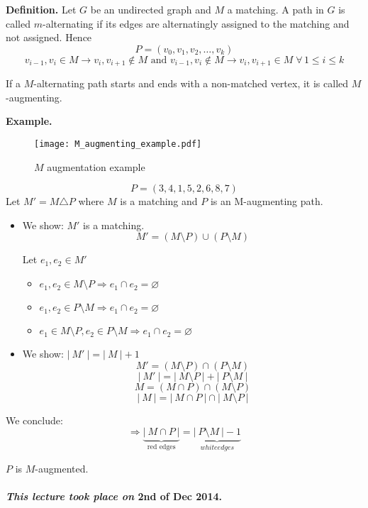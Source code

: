 \documentclass{article}
\newcommand{\card}[1]{\left|\:\!#1\:\!\right|}
\newcommand{\dateref}[1]{\paragraph{\textit{This lecture took place on} #1.}}
\newcommand{\fall}{\;\forall\,}
\begin{document}
\textbf{Definition.}
  Let $G$ be an undirected graph and $M$ a matching. A path in $G$ is called $m$-alternating if its edges are alternatingly assigned to the matching and not assigned. Hence
  \[ P = (v_0, v_1, v_2, \ldots, v_k) \]
  \[
    v_{i-1}, v_i \in M \rightarrow v_i, v_{i+1} \notin M \text{ and }
    v_{i-1}, v_i \notin M \rightarrow v_i, v_{i+1} \in M
    \fall 1 \leq i \leq k
  \]

  If a $M$-alternating path starts and ends with a non-matched vertex, it is called $M$-augmenting.

\textbf{Example.}
  \begin{figure}[h]
   \begin{center}
    \texttt{[image: M\_augmenting\_example.pdf]}
    \caption{$M$ augmentation example}
   \end{center}
  \end{figure}

  \[ P = (3, 4, 1, 5, 2, 6, 8, 7) \]
  Let $M' = M \triangle P$ where $M$ is a matching and $P$ is an M-augmenting path.

\begin{itemize}
  \item We show: $M'$ is a matching.
    \[ M' = (M \setminus P) \cup (P \setminus M) \]

    Let $e_1, e_2 \in M'$
    \begin{itemize}
      \item $e_1, e_2 \in M \setminus P \Rightarrow e_1 \cap e_2 = \diameter$
      \item $e_1, e_2 \in P \setminus M \Rightarrow e_1 \cap e_2 = \diameter$
      \item $e_1 \in M \setminus P, e_2 \in P \setminus M \Rightarrow e_1 \cap e_2 = \diameter$
    \end{itemize}

  \item We show: $\card{M'} = \card{M} + 1$
    \[ M' = (M \setminus P) \cap (P \setminus M) \]
    \[ \card{M'} = \card{M \setminus P} + \card{P \setminus M} \]
    \[ M = (M \cap P) \cap (M \setminus P) \]
    \[ \card{M} = \card{M \cap P} \cap \card{M \setminus P} \]
\end{itemize}

We conclude:
\[ \Rightarrow \underbrace{\card{M \cap P}}_{\text{red edges}} = \underbrace{\card{P \setminus M} - 1}_{white edges} \]

$P$ is $M$-augmented.

\dateref{2nd of Dec 2014}
\end{document}

